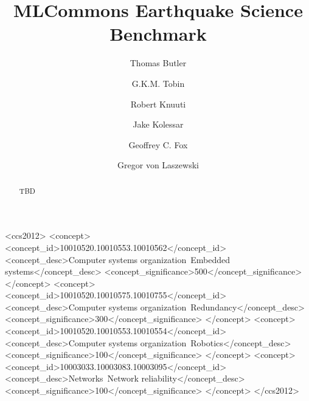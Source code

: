 \documentclass[sigplan,screen]{acmart}
\begin{document}
\title{MLCommons Earthquake Science Benchmark}

\author{Thomas Butler}
\author{G.K.M. Tobin}

\author{Robert Knuuti}

\author{Jake Kolessar}

\author{Geoffrey C. Fox}

\author{Gregor von Laszewski}


\renewcommand{\shortauthors}{Buttler, Knuuti, Kolesar, Fox, von Laszewski}

\begin{abstract}
TBD
\end{abstract}

\begin{CCSXML}
<ccs2012>
 <concept>
  <concept_id>10010520.10010553.10010562</concept_id>
  <concept_desc>Computer systems organization~Embedded systems</concept_desc>
  <concept_significance>500</concept_significance>
 </concept>
 <concept>
  <concept_id>10010520.10010575.10010755</concept_id>
  <concept_desc>Computer systems organization~Redundancy</concept_desc>
  <concept_significance>300</concept_significance>
 </concept>
 <concept>
  <concept_id>10010520.10010553.10010554</concept_id>
  <concept_desc>Computer systems organization~Robotics</concept_desc>
  <concept_significance>100</concept_significance>
 </concept>
 <concept>
  <concept_id>10003033.10003083.10003095</concept_id>
  <concept_desc>Networks~Network reliability</concept_desc>
  <concept_significance>100</concept_significance>
 </concept>
</ccs2012>
\end{CCSXML}

\end{document}
